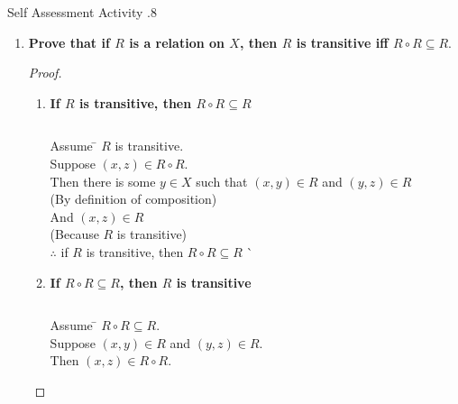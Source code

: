 \documentclass[../notes.tex]{subfiles}
\begin{document}
\begin{exercise}{Self Assessment Activity \thechapter.8}
\begin{enumerate}
\begin{enumerate}[label=(\alph*)]
							\end{enumerate}
						\item \textbf{Prove that if $R$ is a relation on $X$, then $R$ is transitive iff $R \circ R \subseteq R$}.
							\begin{proof}
								$ $
								\begin{enumerate}[label=(\roman*)]
									\item \textbf{If $R$ is transitive, then $R \circ R \subseteq R$}
										\begin{subproof}[Subproof]
											$ $
											\begin{tabbing}
												Assume \qquad \= $R$ is transitive.\\
												Suppose \> $(x, z) \in R \circ R$.\\
												Then \> there is some $y \in X$ such that $(x, y) \in R$ and $(y, z) \in R$\\
												\> (By definition of composition)\\
												And \> $(x, z) \in R$\\
												\> (Because $R$ is transitive)\\
												$\therefore$ \> if $R$ is transitive, then $R \circ R \subseteq R$ \` \qedhere
											\end{tabbing}
										\end{subproof}
									\pagebreak
									\item \textbf{If $R \circ R \subseteq R$, then $R$ is transitive}
										\begin{subproof}[Subproof]
											$ $
											\begin{tabbing}
												Assume \qquad \= $R \circ R \subseteq R$.\\
												Suppose \> $(x, y) \in R$ and $(y, z) \in R$.\\
												Then \> $(x, z) \in R \circ R$.\\

\end{tabbing}
\end{subproof}
\end{enumerate}
\end{proof}
\end{enumerate}
\end{exercise}
\end{document}

